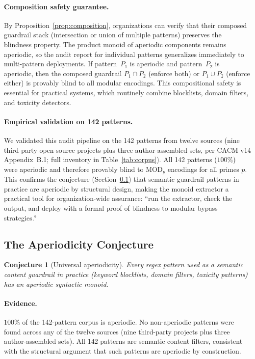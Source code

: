 \documentclass[letterpaper,twocolumn,10pt]{article}
\newtheorem{conjecture}[theorem]{Conjecture}
\theoremstyle{definition}
\theoremstyle{remark}
\begin{document}
\paragraph{Composition safety guarantee.}
By Proposition~\ref{prop:composition}, organizations can verify that their composed
guardrail stack (intersection or union of multiple patterns) preserves the blindness
property.
The product monoid of aperiodic components remains aperiodic, so the audit report
for individual patterns generalizes immediately to multi-pattern deployments.
If pattern~$P_1$ is aperiodic and pattern~$P_2$ is aperiodic, then the composed
guardrail $P_1 \cap P_2$ (enforce both) or $P_1 \cup P_2$ (enforce either) is
provably blind to all modular encodings.
This compositional safety is essential for practical systems, which routinely combine
blocklists, domain filters, and toxicity detectors.

\paragraph{Empirical validation on 142 patterns.}
We validated this audit pipeline on the 142 patterns from twelve sources
(nine third-party open-source projects plus three author-assembled sets,
per CACM v14 Appendix~B.1; full inventory in Table~\ref{tab:corpus}).
All 142 patterns ($100\%$) were aperiodic and therefore provably blind to
$\mathrm{MOD}_p$ encodings for all primes $p$.
This confirms the conjecture (Section~\ref{sec:conjecture}) that semantic guardrail
patterns in practice are aperiodic by structural design, making the monoid extractor
a practical tool for organization-wide assurance: ``run the extractor, check the
output, and deploy with a formal proof of blindness to modular bypass strategies.''

\subsection{The Aperiodicity Conjecture}\label{sec:conjecture}

\begin{conjecture}[Universal aperiodicity]\label{conj:aperiodic}
Every regex pattern used as a semantic content guardrail in practice (keyword
blocklists, domain filters, toxicity patterns) has an aperiodic syntactic monoid.
\end{conjecture}

\paragraph{Evidence.}
$100\%$ of the 142-pattern corpus is aperiodic.
No non-aperiodic patterns were found across any of the twelve sources
(nine third-party projects plus three author-assembled sets).
All 142 patterns are semantic content filters, consistent with the structural
argument that such patterns are aperiodic by construction.
\end{document}
